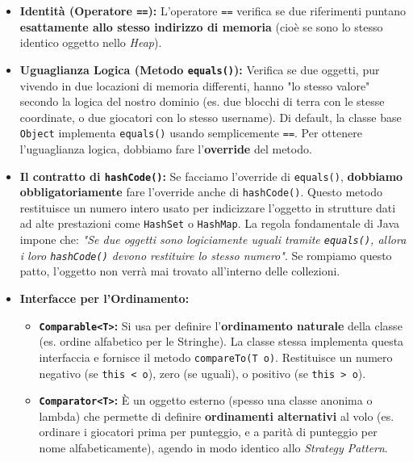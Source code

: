 \documentclass[12pt, a4paper]{article}
\begin{document}
\begin{itemize}
    \item \textbf{Identità (Operatore \texttt{==}):} L'operatore \texttt{==} verifica se due riferimenti puntano \textbf{esattamente allo stesso indirizzo di memoria} (cioè se sono lo stesso identico oggetto nello \textit{Heap}).
    \item \textbf{Uguaglianza Logica (Metodo \texttt{equals()}):} Verifica se due oggetti, pur vivendo in due locazioni di memoria differenti, hanno "lo stesso valore" secondo la logica del nostro dominio (es. due blocchi di terra con le stesse coordinate, o due giocatori con lo stesso username). Di default, la classe base \texttt{Object} implementa \texttt{equals()} usando semplicemente \texttt{==}. Per ottenere l'uguaglianza logica, dobbiamo fare l'\textbf{override} del metodo.
    

    \item \textbf{Il contratto di \texttt{hashCode()}:} 
    Se facciamo l'override di \texttt{equals()}, \textbf{dobbiamo obbligatoriamente} fare l'override anche di \texttt{hashCode()}. Questo metodo restituisce un numero intero usato per indicizzare l'oggetto in strutture dati ad alte prestazioni come \texttt{HashSet} o \texttt{HashMap}. La regola fondamentale di Java impone che: \textit{"Se due oggetti sono logiciamente uguali tramite \texttt{equals()}, allora i loro \texttt{hashCode()} devono restituire lo stesso numero"}. Se rompiamo questo patto, l'oggetto non verrà mai trovato all'interno delle collezioni.

    \item \textbf{Interfacce per l'Ordinamento:}
    \begin{itemize}
        \item \textbf{\texttt{Comparable<T>}:} Si usa per definire l'\textbf{ordinamento naturale} della classe (es. ordine alfabetico per le Stringhe). La classe stessa implementa questa interfaccia e fornisce il metodo \texttt{compareTo(T o)}. Restituisce un numero negativo (se \texttt{this < o}), zero (se uguali), o positivo (se \texttt{this > o}).
        \item \textbf{\texttt{Comparator<T>}:} È un oggetto esterno (spesso una classe anonima o lambda) che permette di definire \textbf{ordinamenti alternativi} al volo (es. ordinare i giocatori prima per punteggio, e a parità di punteggio per nome alfabeticamente), agendo in modo identico allo \textit{Strategy Pattern}.
    \end{itemize}
\end{itemize}
\end{document}
